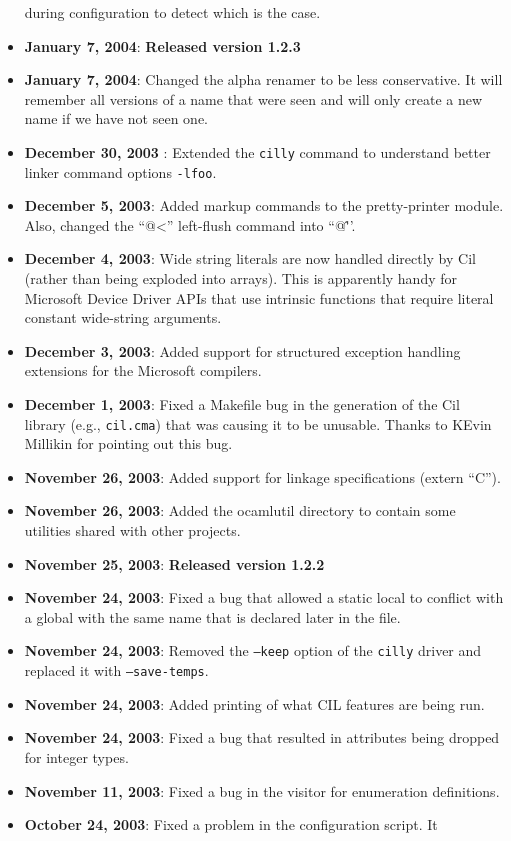 \documentclass{article}
\def\t#1{{\tt #1}}
\begin{document}
\begin{itemize}
  during configuration to detect which is the case. 
\item {\bf January 7, 2004}: {\bf Released version 1.2.3}
\item {\bf January 7, 2004}: Changed the alpha renamer to be less
conservative. It will remember all versions of a name that were seen and will
only create a new name if we have not seen one. 
\item {\bf December 30, 2003} : Extended the \t{cilly} command to understand
  better linker command options \t{-lfoo}. 
\item {\bf December 5, 2003}: Added markup commands to the pretty-printer
module. Also, changed the ``@<'' left-flush command into ``@\^''.
\item {\bf December 4, 2003}: Wide string literals are now handled
directly by Cil (rather than being exploded into arrays). This is
apparently handy for Microsoft Device Driver APIs that use intrinsic
functions that require literal constant wide-string arguments. 
\item {\bf December 3, 2003}: Added support for structured exception handling
  extensions for the Microsoft compilers.
\item {\bf December 1, 2003}: Fixed a Makefile bug in the generation of the 
Cil library (e.g., \t{cil.cma}) that was causing it to be unusable. Thanks
to KEvin Millikin for pointing out this bug. 
\item {\bf November 26, 2003}: Added support for linkage specifications
       (extern ``C''). 
\item {\bf November 26, 2003}: Added the ocamlutil directory to contain some
utilities shared with other projects. 
\item {\bf November 25, 2003}: {\bf Released version 1.2.2}
\item {\bf November 24, 2003}: Fixed a bug that allowed a static local to
  conflict with a global with the same name that is declared later in the
  file. 
\item {\bf November 24, 2003}: Removed the \t{--keep} option of the \t{cilly}
  driver and replaced it with \t{--save-temps}.
\item {\bf November 24, 2003}: Added printing of what CIL features are being
  run.
\item {\bf November 24, 2003}: Fixed a bug that resulted in attributes being
  dropped for integer types. 
\item {\bf November 11, 2003}: Fixed a bug in the visitor for enumeration
  definitions. 
\item {\bf October 24, 2003}: Fixed a problem in the configuration script. It

\end{itemize}
\end{document}
